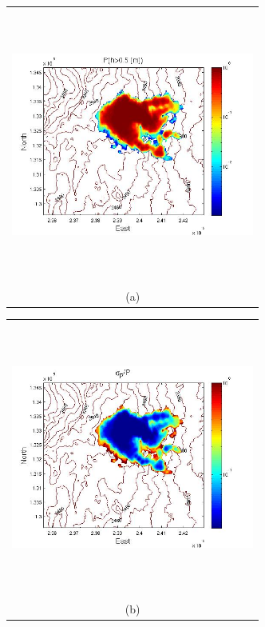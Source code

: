 \documentclass{article}
\newcommand{\Pic}[2][0.85]{\begin{center}\texttt{[image: \#2]}
 \end{center} }
\begin{document}
\begin{figure}[H]
      \begin{minipage}[b]{0.6\textwidth}
        \begin{tabular}{c}
       \includegraphics[width=8cm,height=9cm,keepaspectratio]{figs/Galeras_Aster30_P.jpg}\\
        (a)
        \end{tabular}
    \end{minipage}
    \begin{minipage}{0.6\textwidth}
        \begin{tabular}{c}
	\includegraphics[width=8cm,height=9cm,keepaspectratio]{figs/Galeras_Aster30_sigma.jpg}\\
        (b)

\end{tabular}
\end{minipage}
\end{figure}
\end{document}
